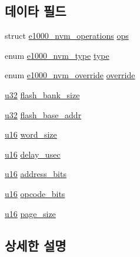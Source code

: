 \subsection*{데이타 필드}
\begin{DoxyCompactItemize}
\item 
struct \hyperlink{structe1000__nvm__operations}{e1000\+\_\+nvm\+\_\+operations} \hyperlink{structe1000__nvm__info_a12baf99f899cbc083e85c8d1331a7773}{ops}
\item 
enum \hyperlink{kmod_2igb_2e1000__hw_8h_ab9395833db36010a400eea73d9f90eff}{e1000\+\_\+nvm\+\_\+type} \hyperlink{structe1000__nvm__info_aed407b4a0d2f26f9223d7bfa7bb2ad5b}{type}
\item 
enum \hyperlink{kmod_2igb_2e1000__hw_8h_a0d67e5f076b5fc63a5067e3b923552f2}{e1000\+\_\+nvm\+\_\+override} \hyperlink{structe1000__nvm__info_a998854fce83900d8ef69aec311b464e7}{override}
\item 
\hyperlink{lib_2igb_2e1000__osdep_8h_a64e91c10a0d8fb627e92932050284264}{u32} \hyperlink{structe1000__nvm__info_a50aa1e3c49675045e1992c3435927b7b}{flash\+\_\+bank\+\_\+size}
\item 
\hyperlink{lib_2igb_2e1000__osdep_8h_a64e91c10a0d8fb627e92932050284264}{u32} \hyperlink{structe1000__nvm__info_ae94ac7d19708a37fb8dbd72466cd6001}{flash\+\_\+base\+\_\+addr}
\item 
\hyperlink{lib_2igb_2e1000__osdep_8h_acdc9cf0314be0ae5a01d6d4379a95edd}{u16} \hyperlink{structe1000__nvm__info_af882c5e0880f3f4119b0aef0f7aa9357}{word\+\_\+size}
\item 
\hyperlink{lib_2igb_2e1000__osdep_8h_acdc9cf0314be0ae5a01d6d4379a95edd}{u16} \hyperlink{structe1000__nvm__info_a3d6025c25095a2fa2809b29fd4fc5f8d}{delay\+\_\+usec}
\item 
\hyperlink{lib_2igb_2e1000__osdep_8h_acdc9cf0314be0ae5a01d6d4379a95edd}{u16} \hyperlink{structe1000__nvm__info_abb01723804d22f0c3c8a4fd503f26bf8}{address\+\_\+bits}
\item 
\hyperlink{lib_2igb_2e1000__osdep_8h_acdc9cf0314be0ae5a01d6d4379a95edd}{u16} \hyperlink{structe1000__nvm__info_a2a55e8d34044fa25950d407750b10128}{opcode\+\_\+bits}
\item 
\hyperlink{lib_2igb_2e1000__osdep_8h_acdc9cf0314be0ae5a01d6d4379a95edd}{u16} \hyperlink{structe1000__nvm__info_a34d2a526ef0e03267a60568ead677ab5}{page\+\_\+size}
\end{DoxyCompactItemize}


\subsection{상세한 설명}



